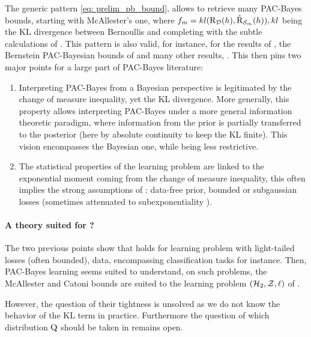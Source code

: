 The generic pattern \eqref{eq: prelim_pb_bound}, allows to retrieve many PAC-Bayes bounds, starting with McAllester's one, where $f_m= kl(\text{R}_{\mathcal{D}}(h),\hat{\text{R}}_{\mathcal{S}_m}(h)), kl$ being the KL divergence between Bernoullis and completing with the subtle calculations of \citet{maurer2004note}. This pattern is also valid, for instance, for the results of \citet{germain2009pac}, the Bernstein PAC-Bayesian bounds of \citet{tolstikhin2013pac,mhammedi2019pac} and many other results, \eg \citet{thiemann2017strongly,guedj2018pac,holland2019pac,wu2022split}. This then pins two major points for a large part of PAC-Bayes literature: 

\begin{enumerate}
  \item Interpreting PAC-Bayes from a Bayesian perspective is legitimated by the change of measure inequality, yet the KL divergence. More generally, this property allows interpreting PAC-Bayes under a more general information theoretic paradigm, where information from the prior is partially transferred to the posterior (here by absolute continuity to keep the KL finite). This vision encompasses the Bayesian one, while being less restrictive.
  \item The statistical properties of the learning problem are linked to the exponential moment coming from the change of measure inequality, this often implies the strong assumptions of : data-free prior, bounded or subgaussian losses (sometimes attenuated to subexponentiality \citealp{catoni2004statistical}).
\end{enumerate}

\paragraph{A theory suited for ?}
The two previous points show that  holds for learning problem with light-tailed losses (often bounded), \iid data, encompassing classification tasks for instance. Then, PAC-Bayes learning seems suited to understand, on such problems, the McAllester and Catoni bounds are suited to the learning problem $(\mathcal{H}_2,\mathcal{Z},\ell)$ of . 

However, the question of their tightness is unsolved as we do not know the behavior of the KL term in practice. Furthermore the question of which distribution $\mathrm{Q}$ should be taken in  remains open.


